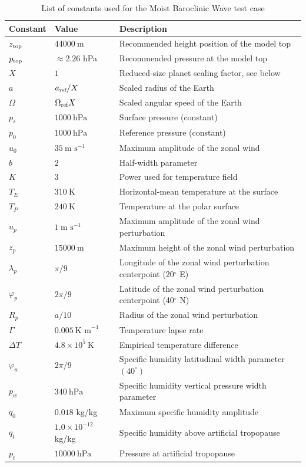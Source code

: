 \documentclass[times,doublespace]{fldauth}
\begin{document}
\begin{table}[h]

\caption{List of constants used for the Moist Baroclinic Wave test case}
\label{test4:tab}
\begin{tabular*}{\textwidth}{@{\extracolsep{\fill}}lll}
\hline Constant & Value & Description \\
\hline 
$z_{\tiny \mbox{top}}$ & $44000\ \mbox{m}$ & Recommended height position of the model top \\
$p_{\tiny \mbox{top}}$ & $\approx 2.26$ hPa & Recommended pressure at the model top\\
$X$ & $1$ & Reduced-size planet scaling factor, see below\\
$a$ & $a_{\tiny \mbox{ref}}/X$ & Scaled radius of the Earth \\
$\Omega$ & $\Omega_{\tiny \mbox{ref}}X$ & Scaled angular speed of the Earth \\
$p_s$ & $1000\ \mbox{hPa}$ & Surface pressure (constant) \\
$p_0$ & $1000\ \mbox{hPa}$ & Reference pressure (constant) \\
$u_0$ & $35\ \mbox{m\ s}^{-1}$ & Maximum amplitude of the zonal wind \\
$b$ & $2$ & Half-width parameter \\
$K$ & $3$ & Power used for temperature field \\
$T_E$ & $310\ \mbox{K}$ & Horizontal-mean temperature at the surface \\
$T_P$ & $240 \ \mbox{K}$ & Temperature at the polar surface\\
$u_p$ & $1\ \mbox{m\ s}^{-1}$ & Maximum amplitude of the zonal wind perturbation \\
$z_p$ & $15000\ \mbox{m}$ & Maximum height of the zonal wind perturbation \\
$\lambda_p$ & $\pi / 9$ & Longitude of the zonal wind perturbation centerpoint (20$^\circ$ E)\\
$\varphi_p$ & $2 \pi / 9$ & Latitude of the zonal wind perturbation centerpoint (40$^\circ$ N)\\
$R_p$ & $a / 10$ & Radius of the zonal wind perturbation \\
$\Gamma$ & $0.005\ \mbox{K\ m}^{-1}$ & Temperature lapse rate \\
$\Delta T$ & $4.8 \times 10^{5}\ \mbox{K}$ & Empirical temperature difference \\
$\varphi_w$ & $2 \pi / 9$ & Specific humidity latitudinal width parameter $(40^\circ)$\\
$p_w$ & $340\ \mbox{hPa}$ & Specific humidity vertical pressure width parameter \\
$q_0$ & $0.018$ kg/kg& Maximum specific humidity amplitude \\
$q_t$ & $1.0 \times 10^{-12}$ kg/kg & Specific humidity above artificial tropopause \\
$p_t$ & $10000\ \mbox{hPa}$ & Pressure at artificial tropopause \\  
\hline 
\end{tabular*}

\end{table}
\end{document}
